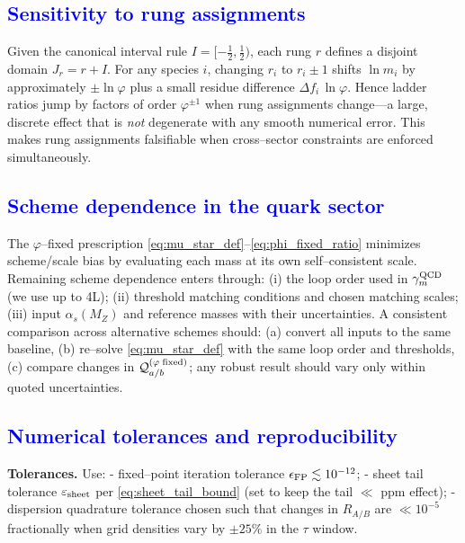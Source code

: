 \documentclass[%
 amsmath,amssymb,
 aps,
prb,
floatfix, showkeys
]{revtex4-2}
\newcommand{\modif}[1]{\textcolor{blue}{#1}}
\begin{document}
{\modif{
\subsection{Sensitivity to rung assignments}
\label{subsec:error_rungs}
}}
Given the canonical interval rule $I=[-\tfrac{1}{2},\tfrac{1}{2})$, each rung $r$ defines a disjoint domain $J_r=r+I$. For any species $i$, changing $r_i$ to $r_i\pm 1$ shifts $\ln \widehat m_i$ by approximately $\pm \ln\varphi$ plus a small residue difference $\Delta f_i\,\ln\varphi$. Hence ladder ratios jump by factors of order $\varphi^{\pm 1}$ when rung assignments change---a large, discrete effect that is \emph{not} degenerate with any smooth numerical error. This makes rung assignments falsifiable when cross--sector constraints are enforced simultaneously.







  {\modif{
\subsection{Scheme dependence in the quark sector}
\label{subsec:error_schemes}
}}
The $\varphi$--fixed prescription \eqref{eq:mu_star_def}–\eqref{eq:phi_fixed_ratio} minimizes scheme/scale bias by evaluating each mass at its own self--consistent scale. Remaining scheme dependence enters through:
(i) the loop order used in $\gamma_m^{\rm QCD}$ (we use up to 4L);
(ii) threshold matching conditions and chosen matching scales;
(iii) input $\alpha_s(M_Z)$ and reference masses with their uncertainties.
A consistent comparison across alternative schemes should:
(a) convert all inputs to the same baseline,
(b) re--solve \eqref{eq:mu_star_def} with the same loop order and thresholds,
(c) compare changes in $\mathcal{Q}_{a/b}^{(\varphi{\rm\;fixed})}$; any robust result should vary only within quoted uncertainties.






{\modif{
\subsection{Numerical tolerances and reproducibility}
\label{subsec:error_reprod}
}}
\textbf{Tolerances.} Use:
- fixed--point iteration tolerance $\epsilon_{\rm FP}\lesssim 10^{-12}$;
- sheet tail tolerance $\varepsilon_{\rm sheet}$ per \eqref{eq:sheet_tail_bound} (set to keep the tail $\ll$ ppm effect);
- dispersion quadrature tolerance chosen such that changes in $R_{A/B}$ are $\ll 10^{-5}$ fractionally when grid densities vary by $\pm 25\%$ in the $\tau$ window.
\end{document}
